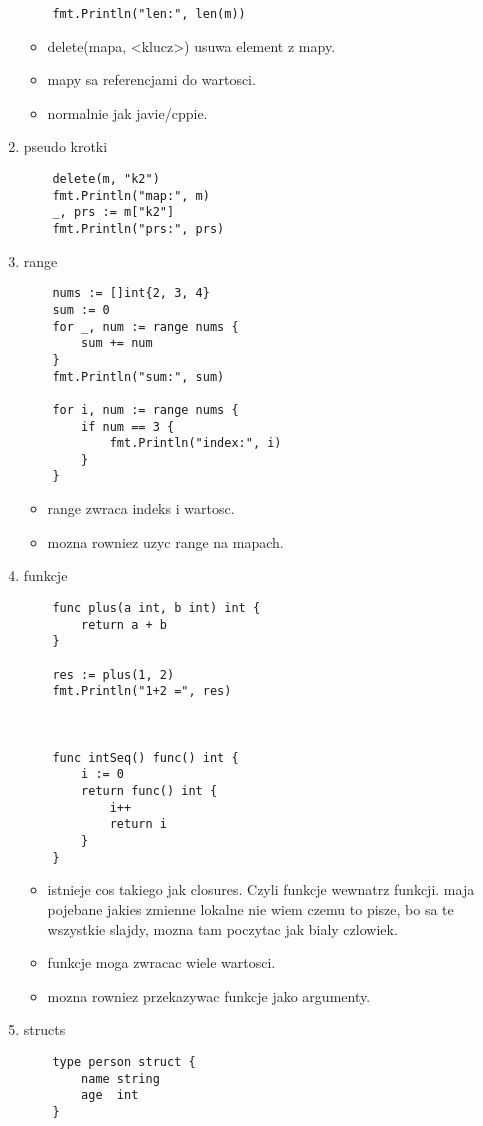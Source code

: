 \documentclass[11pt,a4paper]{article}
\begin{document}
\begin{enumerate}
\begin{verbatim}
    fmt.Println("len:", len(m))
    \end{verbatim}
    \begin{itemize}
        \item delete(mapa, <klucz>) usuwa element z mapy.
        \item mapy sa referencjami do wartosci.
        \item normalnie jak javie/cppie.
    \end{itemize}
\item pseudo krotki \begin{verbatim}
    delete(m, "k2")
    fmt.Println("map:", m)
    _, prs := m["k2"]
    fmt.Println("prs:", prs)
    \end{verbatim}
\item range \begin{verbatim}
    nums := []int{2, 3, 4}
    sum := 0
    for _, num := range nums {
        sum += num
    }
    fmt.Println("sum:", sum)

    for i, num := range nums {
        if num == 3 {
            fmt.Println("index:", i)
        }
    }
    \end{verbatim}
    \begin{itemize}
        \item range zwraca indeks i wartosc.
        \item mozna rowniez uzyc range na mapach.
    \end{itemize}
\item funkcje \begin{verbatim}
    func plus(a int, b int) int {
        return a + b
    }

    res := plus(1, 2)
    fmt.Println("1+2 =", res)



    func intSeq() func() int {
        i := 0
        return func() int {
            i++
            return i
        }
    }
    \end{verbatim}
    \begin{itemize}
        \item istnieje cos takiego jak closures. Czyli funkcje wewnatrz funkcji. maja pojebane jakies zmienne lokalne nie wiem czemu to pisze, bo sa te wszystkie slajdy, mozna tam poczytac jak bialy czlowiek.
        \item funkcje moga zwracac wiele wartosci.
        \item mozna rowniez przekazywac funkcje jako argumenty.
    \end{itemize}
\item structs \begin{verbatim}
    type person struct {
        name string
        age  int
    }


\end{verbatim}
\end{enumerate}
\end{document}
